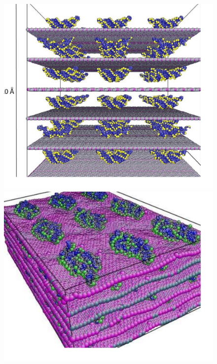 \begin{figure} 
        \begin{center}
           \includegraphics[scale=0.3]{subproject1-bioclays/pic1}
           \includegraphics[scale=0.3]{subproject1-bioclays/pic2}

\end{center}
\end{figure}
